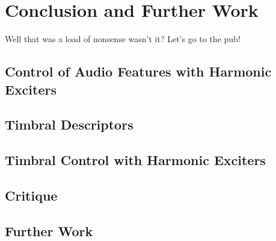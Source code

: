 \chapter{Conclusion and Further Work}
\label{chap:Conclusion}

\note
{
	Well that was a load of nonsense wasn't it? Let's go to the pub!
}

\section{Control of Audio Features with Harmonic Exciters}
\label{sec:Conclusion-FeatureConrol}

\section{Timbral Descriptors}
\label{sec:Conclusion-Descriptors}

\section{Timbral Control with Harmonic Exciters}
\label{sec:Conclusion-TimbralControl}

\section{Critique}
\label{sec:Conclusion-Critique}

\section{Further Work}
\label{sec:Conclusion-FurtherWork}
